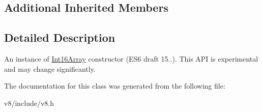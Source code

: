 \subsection*{Additional Inherited Members}


\subsection{Detailed Description}
An instance of \hyperlink{classv8_1_1Int16Array}{Int16\+Array} constructor (E\+S6 draft 15..). This A\+PI is experimental and may change significantly. 

The documentation for this class was generated from the following file\+:\begin{DoxyCompactItemize}
\item 
v8/include/v8.\+h\end{DoxyCompactItemize}
